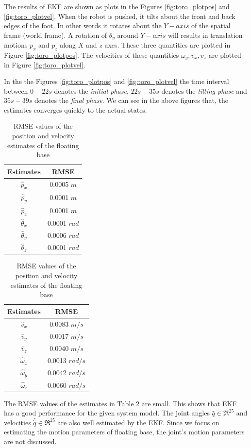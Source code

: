The results of EKF are shown as plots in the Figures \ref{fig:toro_plotpos} and \ref{fig:toro_plotvel}. When the robot is pushed, it tilts about the front and back edges of the foot. In other words it rotates about the $Y-axis$ of the spatial frame (world frame). A rotation of $\theta_y$ around $Y-axis$ will results in translation motions $p_x$ and $p_z$ along $X$ and $z$ axes. These three quantities are plotted in Figure \ref{fig:toro_plotpos}. The velocities of these quantities $\omega_y,v_x,v_z$ are plotted in Figure \ref{fig:toro_plotvel}. 

In the the Figures \ref{fig:toro_plotpos} and \ref{fig:toro_plotvel} the time interval between $0-22s$ denotes the \emph{initial phase}, $22s-35s$ denotes the \emph{tilting phase} and $35s-39s$ denotes the \emph{final phase}. We can see in the above figures that, the estimates converges quickly to the actual states. 
\begin{table}
    \centering
    \begin{tabular}{|c|c|}
    \hline
    Estimates &RMSE \\ \hline
    $\hat p_x$ &0.0005 $m$\\
    $\hat p_y$ &0.0001 $m$\\
    $\hat p_z$ &0.0001 $m$\\
    $\hat\theta_x$ &0.0001 $rad$\\
    $\hat\theta_y$ &0.0006 $rad$\\
    $\hat\theta_z$ &0.0001 $rad$\\ \hline
    \end{tabular} \hspace{1cm}
    \begin{tabular}{|c|c|}
    \hline
    Estimates &RMSE \\ \hline
    $\hat v_x$ &0.0083 $m/s$\\
    $\hat v_y$ &0.0017 $m/s$\\
    $\hat v_z$ &0.0040 $m/s$\\
    $\hat\omega_x$ &0.0013 $rad/s$\\
    $\hat\omega_y$ &0.0042 $rad/s$\\
    $\hat\omega_z$ &0.0060 $rad/s$\\ \hline
    \end{tabular}
    \caption{RMSE values of the position and velocity estimates of the floating base}
    \label{tab:toro_rmse}
\end{table}

The RMSE values of the estimates in Table \ref{tab:toro_rmse} are small. This shows that EKF has a good performance for the given system model. The joint angles $ \hat q \in \Re^{25}$ and velocities $\hat \dot q \in \Re^{25}$ are also well estimated by the EKF. Since we focus on estimating the motion parameters of floating base, the joint's motion parameters are not discussed.

